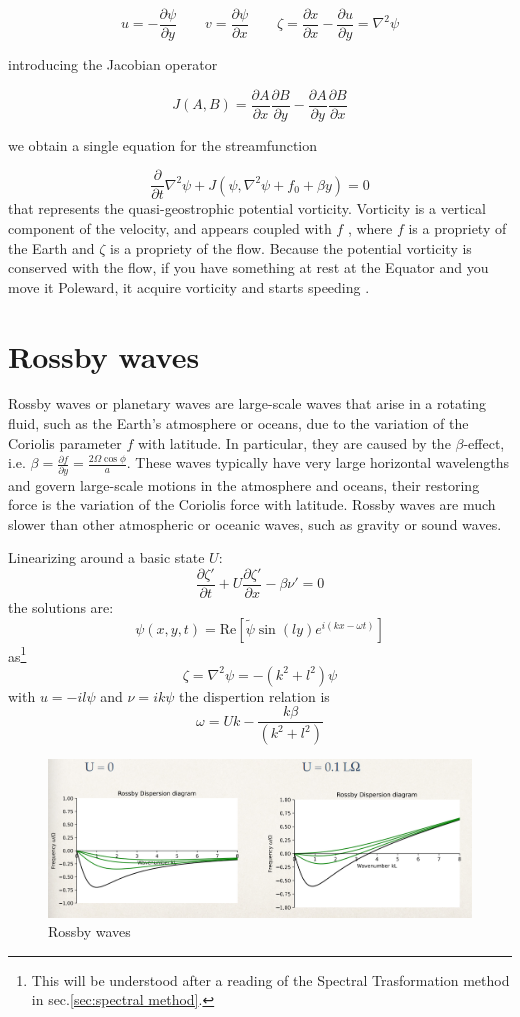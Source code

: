 \[u=-\frac{\partial \psi}{\partial y}\qquad v=\frac{\partial \psi}{\partial x} \qquad
\zeta = \frac{\partial x}{\partial x} -\frac{\partial u}{\partial y}=\nabla^2\psi\]

introducing the Jacobian operator

\[J(A,B) = \frac{\partial A}{\partial x}\frac{\partial B}{\partial y} - \frac{\partial A}{\partial y}\frac{\partial B}{\partial x}\]

we obtain a single equation for the streamfunction

\[\frac{\partial }{\partial t}\nabla^2\psi  + J(\psi, \nabla^2\psi +f_0 + \beta y) = 0\]
that represents the quasi-geostrophic potential vorticity.
Vorticity is a vertical component of the velocity, and appears coupled with $f$ , where $f$ is a propriety of the Earth and $\zeta$  is a propriety of the flow. Because the potential vorticity is conserved with the flow, if you have something at rest at the Equator and you move it Poleward, it acquire vorticity and starts speeding .


\section{Rossby waves}
Rossby waves or planetary waves are large-scale waves that arise in a rotating fluid, such as the Earth's atmosphere or oceans, due to the variation of the Coriolis parameter $f$ with latitude. In particular, they are caused by the $\beta$-effect, i.e. $\beta=\frac{\partial f}{\partial y}=\frac{2\Omega\cos\phi}{a}$. These waves typically have very large horizontal wavelengths and govern large-scale motions in the atmosphere and oceans, their restoring force is the variation of the Coriolis force with latitude. Rossby waves are much slower than other atmospheric or oceanic waves, such as gravity or sound waves.

Linearizing around a basic state $U$:
\begin{equation}
    \frac{\partial\zeta'}{\partial t}+U\frac{\partial\zeta'}{\partial x}-\beta\nu'=0
\end{equation}
the solutions are:
\begin{equation}
    \psi(x,y,t)=\text{Re}\left[\tilde{\psi}\sin(ly)e^{i(kx-\omega t)}\right]
\end{equation}
as\footnote{This will be understood after a reading of the Spectral Trasformation method in sec.\ref{sec:spectral method}.} $$\zeta=\nabla^2\psi=-(k^2+l^2)\psi$$
with $u=-il\psi$ and $\nu=ik\psi$
the dispertion relation is $$\omega=Uk-\frac{k\beta}{(k^2+l^2)}$$
\begin{figure}[htpb]
    \centering
    \includegraphics[width=0.5\linewidth]{uploads/Screenshot 2024-11-21 162828.png}
    \caption{Rossby waves}
    \label{fig:enter-label}
\end{figure}

